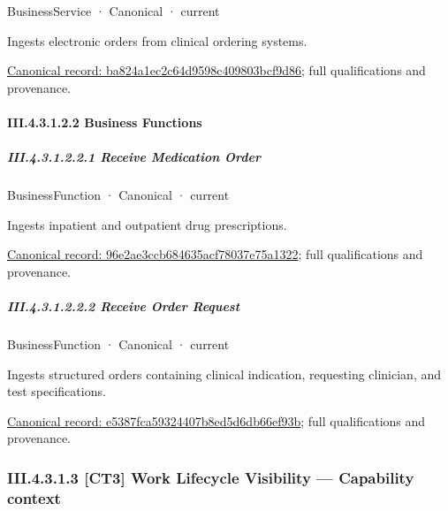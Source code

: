 \label{element:ba824a1ec2c64d9598c409803bcf9d86}
{\small BusinessService · Canonical · current}\par

Ingests electronic orders from clinical ordering systems.


{\footnotesize \href{../../../../continuum/business/business-service/ba824a1ec2c64d9598c409803bcf9d86.md}{Canonical record: ba824a1ec2c64d9598c409803bcf9d86}; full qualifications and provenance.}\par
\paragraph*{III.4.3.1.2.2 Business Functions}
\label{navigation:III.4.3.1.2.2}

\subparagraph*{III.4.3.1.2.2.1 Receive Medication Order}
\label{navigation:III.4.3.1.2.2.1}

\label{element:96e2ae3ccb684635acf78037e75a1322}
{\small BusinessFunction · Canonical · current}\par

Ingests inpatient and outpatient drug prescriptions.


{\footnotesize \href{../../../../continuum/business/business-function/96e2ae3ccb684635acf78037e75a1322.md}{Canonical record: 96e2ae3ccb684635acf78037e75a1322}; full qualifications and provenance.}\par
\subparagraph*{III.4.3.1.2.2.2 Receive Order Request}
\label{navigation:III.4.3.1.2.2.2}

\label{element:e5387fca59324407b8ed5d6db66ef93b}
{\small BusinessFunction · Canonical · current}\par

Ingests structured orders containing clinical indication, requesting clinician, and test specifications.


{\footnotesize \href{../../../../continuum/business/business-function/e5387fca59324407b8ed5d6db66ef93b.md}{Canonical record: e5387fca59324407b8ed5d6db66ef93b}; full qualifications and provenance.}\par
\subsubsection*{III.4.3.1.3 [CT3] Work Lifecycle Visibility — Capability context}
\label{navigation:III.4.3.1.3}

